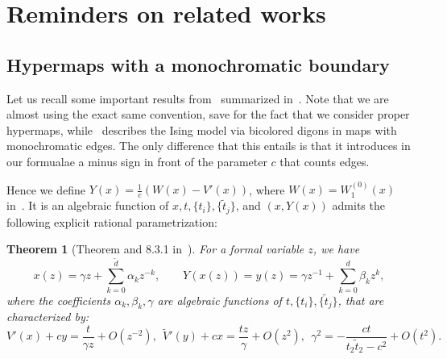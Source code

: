 \documentclass{scrartcl}
\newtheorem{thm}{Theorem}[section]
\begin{document}
\section{Reminders on related works}
\label{sec:reminders}

\subsection{Hypermaps with a monochromatic boundary}
\label{sec:reminder-mono}


Let us recall some important results from~\cite{Eyn_2003} summarized in~\cite[Chapter 8]{eynard}. Note that we are almost using the exact same convention, save for the fact that we consider proper hypermaps, while~\cite[Chapter 8]{eynard} describes the Ising model via bicolored digons in maps with monochromatic edges. The only difference that this entails is that it introduces in our formualae a minus sign in front of the parameter $c$ that counts edges.

Hence we define $Y(x)=\frac{1}{c}(W(x)-V'(x))$, where $W(x)=W^{(0)}_1(x)$ in~\cite{eynard}. It is an algebraic function of $x, t, \{t_i\}, \{\widetilde{t}_j\}$, and $(x,Y(x))$ admits the following explicit rational parametrization:

\begin{thm}[Theorem \cite{Eyn_2003} and 8.3.1 in~\cite{eynard}]
For a formal variable $z$, we have
\begin{equation}
  x(z)=\gamma z + \sum_{k=0}^{\widetilde{d}} \alpha_k z^{-k}, \qquad  Y(x(z))=y(z)=\gamma z^{-1} + \sum_{k=0}^{d} \beta_k z^{k},
\label{eq:xy-param}
\end{equation}
where the coefficients $\alpha_k,\beta_k,\gamma$ are algebraic functions of $ t, \{t_i\}, \{\widetilde{t}_j\}$, that are characterized by:
\begin{equation}
    V'(x)+cy = \frac{t}{\gamma z} + O(z^{-2}), \ \ \tilde V'(y)+cx = \frac{tz}{\gamma} + O(z^{2}), \ \ \gamma^2=-\frac{ct}{t_2\widetilde{t}_2-c^2}+O(t^2).
\label{eq:system-on-alpha-beta-gamma}
\end{equation}
\end{thm}
\end{document}
